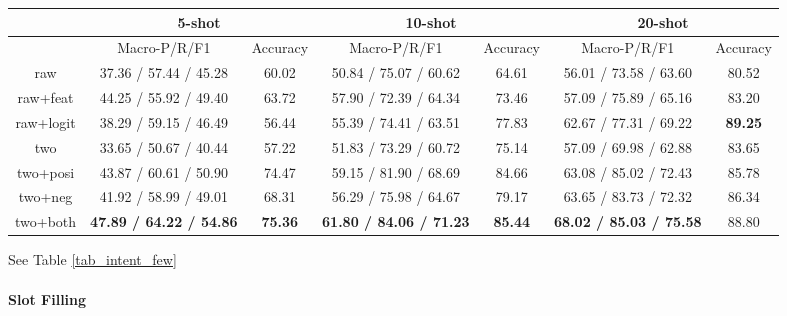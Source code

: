 \begin{table*}
\setlength{\tabcolsep}{0.23em}
\centering
\small{
\begin{tabular}{|c|c|c|c|c|c|c|}

\hline
  & \multicolumn{2}{|c|}{5-shot} & \multicolumn{2}{|c|}{10-shot} & \multicolumn{2}{|c|}{20-shot}  \\
 \hline
  & Macro-P/R/F1 & Accuracy & Macro-P/R/F1 & Accuracy  & Macro-P/R/F1 & Accuracy   \\
\hline
raw & 37.36 / 57.44 / 45.28 & 60.02 & 50.84 / 75.07 / 60.62 & 64.61 & 56.01 / 73.58 / 63.60 & 80.52  \\
\hline
raw+feat & 44.25 / 55.92 / 49.40 & 63.72 & 57.90 / 72.39 / 64.34 & 73.46 & 57.09 / 75.89 / 65.16 & 83.20   \\
\hline
raw+logit & 38.29 / 59.15 / 46.49 & 56.44 & 55.39 / 74.41 / 63.51 & 77.83 & 62.67 / 77.31 / 69.22 & \textbf{89.25} \\
\hline
two & 33.65 / 50.67 / 40.44 & 57.22 & 51.83 / 73.29 / 60.72 & 75.14 & 57.09 / 69.98 / 62.88 & 83.65  \\
\hline
two+posi & 43.87 / 60.61 / 50.90 & 74.47 & 59.15 / 81.90 / 68.69 & 84.66 & 63.08 / 85.02 / 72.43 & 85.78  \\
\hline
two+neg & 41.92 / 58.99 / 49.01 & 68.31 & 56.29 / 75.98 / 64.67 & 79.17 & 63.65 / 83.73 / 72.32 & 86.34   \\
\hline
two+both & \textbf{47.89 / 64.22 / 54.86} & \textbf{75.36} & \textbf{61.80 / 84.06 / 71.23} & \textbf{85.44} & \textbf{68.02 / 85.03 / 75.58} & 88.80   \\
\hline

\end{tabular}
}
\caption{Intent Detection Result on Few-Shot Data}
\label{tab_intent_few}
\end{table*}
See Table \ref{tab_intent_few}


\paragraph{Slot Filling}

